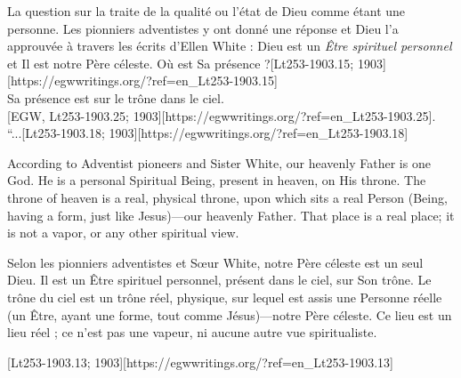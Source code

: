La question sur la  traite de la qualité ou l'état de Dieu comme étant une personne. Les pionniers adventistes y ont donné une réponse et Dieu l'a approuvée à travers les écrits d'Ellen White : Dieu est un \textit{Être spirituel personnel} et Il est notre Père céleste. Où est Sa présence ?[Lt253-1903.15; 1903][https://egwwritings.org/?ref=en\_Lt253-1903.15] \\
Sa présence est sur le trône dans le ciel. \\
[EGW, Lt253-1903.25; 1903][https://egwwritings.org/?ref=en\_Lt253-1903.25]. \\
“...[Lt253-1903.18; 1903][https://egwwritings.org/?ref=en\_Lt253-1903.18]


According to Adventist pioneers and Sister White, our heavenly Father is one God. He is a personal Spiritual Being, present in heaven, on His throne. The throne of heaven is a real, physical throne, upon which sits a real Person (Being, having a form, just like Jesus)—our heavenly Father. That place is a real place; it is not a vapor, or any other spiritual view.


Selon les pionniers adventistes et Sœur White, notre Père céleste est un seul Dieu. Il est un Être spirituel personnel, présent dans le ciel, sur Son trône. Le trône du ciel est un trône réel, physique, sur lequel est assis une Personne réelle (un Être, ayant une forme, tout comme Jésus)—notre Père céleste. Ce lieu est un lieu réel ; ce n'est pas une vapeur, ni aucune autre vue spiritualiste.


[Lt253-1903.13; 1903][https://egwwritings.org/?ref=en\_Lt253-1903.13]


